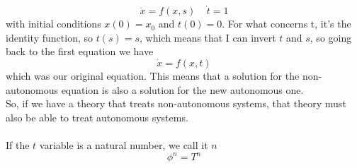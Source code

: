 $$
	\dot{x} = f(x,s) \ \ \ \ \ \dot{t} = 1
$$
with initial conditions $x(0) = x_0$ and $t(0) = 0$. For what concerns t, it's the identity function, so $t(s) = s$, which means that I can invert $t$ and $s$, so going back to the first equation we have
$$
	\dot{x} = f(x,t)
$$
which was our original equation. This means that a solution for the non-autonomous equation is also a solution for the new autonomous one. \\
So, if we have a theory that treats non-autonomous systems, that theory must also be able to treat autonomous systems. \\ \\
If the $t$ variable is a natural number, we call it $n$
$$
	\phi^n = T^n
$$